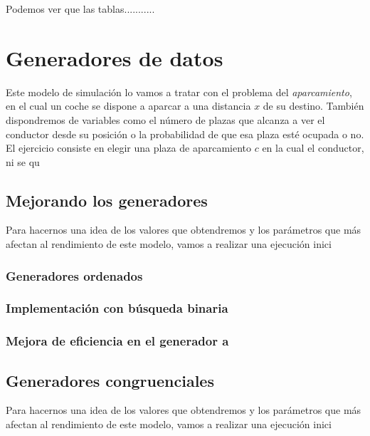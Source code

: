\documentclass[11pt,a4paper]{report}
\begin{document}
Podemos ver que las tablas...........


\chapter{Generadores de datos}

Este modelo de simulación lo vamos a tratar con el problema del \textit{aparcamiento}, en el cual un coche se dispone
a aparcar a una distancia $x$ de su destino. También dispondremos de variables como el número de plazas que alcanza a
ver el conductor desde su posición o la probabilidad de que esa plaza esté ocupada o no. El ejercicio consiste en elegir
una plaza de aparcamiento $c$ en la cual el conductor, ni se qu


\section{Mejorando los generadores}

Para hacernos una idea de los valores que obtendremos y los parámetros que más afectan al rendimiento de este modelo,
vamos a realizar una ejecución inici

\subsection{Generadores ordenados}

\subsection{Implementación con búsqueda binaria}

\subsection{Mejora de eficiencia en el generador a}


\section{Generadores congruenciales}

Para hacernos una idea de los valores que obtendremos y los parámetros que más afectan al rendimiento de este modelo,
vamos a realizar una ejecución inici
\end{document}
